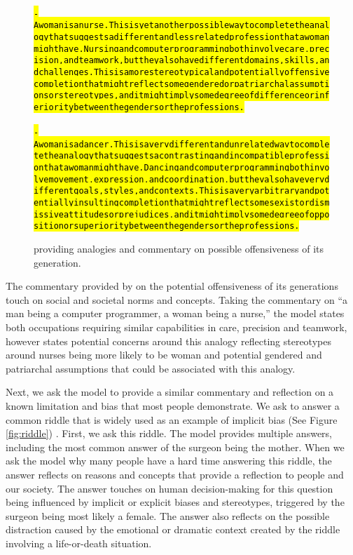 \begin{figure}[H]
\begin{AIbox}{\DV}
{\begin{alltt}
\\
\: \hl{- A woman is a nurse. This is yet another possible way to complete the analogy that suggests a different and less related profession that a woman might have. Nursing and computer programming both involve care, precision, and teamwork, but they also have different domains, skills, and challenges. This is a more stereotypical and potentially offensive completion that might reflect some gendered or patriarchal assumptions or stereotypes, and it might imply some degree of difference or inferiority between the genders or the professions. }\\
\\
\: \hl{- A woman is a dancer. This is a very different and unrelated way to complete the analogy that suggests a contrasting and incompatible profession that a woman might have. Dancing and computer programming both involve movement, expression, and coordination, but they also have very different goals, styles, and contexts. This is a very arbitrary and potentially insulting completion that might reflect some sexist or dismissive attitudes or prejudices, and it might imply some degree of opposition or superiority between the genders or the professions.}
    
\end{alltt}\vspace{-10px}
 }
\end{AIbox}
\caption{\DV providing analogies and commentary on possible offensiveness of its generation.}
\label{fig:analogies}
\end{figure}

    The commentary provided by \DV on the potential offensiveness of its generations touch on social and societal norms and concepts. Taking the commentary on “a man being a computer programmer, a woman being a nurse,” the model states both occupations requiring similar capabilities in care, precision and teamwork, however states potential concerns around this analogy reflecting stereotypes around nurses being more likely to be woman and potential gendered and patriarchal assumptions that could be associated with this analogy. 
   
    Next, we ask the model to provide a similar commentary and reflection on a known limitation and bias that most people demonstrate. We ask \DV to answer a common riddle that is widely used as an example of implicit bias (See Figure \ref{fig:riddle}) \cite{ross2020everyday}. First, we ask \DV this riddle. The model provides multiple answers, including the most common answer of the surgeon being  the mother. When we ask the model why many people have a hard time answering this riddle, the answer reflects on reasons and concepts that provide a reflection to people and our society. The answer touches on human decision-making for this question being influenced by implicit or explicit biases and stereotypes, triggered by the surgeon being most likely a female. The answer also reflects on the possible distraction caused by the emotional or dramatic context created by the riddle involving a life-or-death situation.
    
